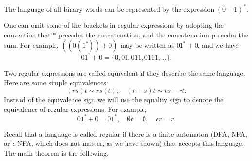 \begin{page}
\setcounter{section}{2}
\setcounter{subsection}{1}
\setcounter{dfn}{1}
\label{portion:952}

\begin{exl}
The language of all binary words can be represented by the expression $(0+1)^*$.
\end{exl}

\end{page}

\begin{page}
\setcounter{section}{2}
\setcounter{subsection}{1}
\setcounter{dfn}{1}
\label{portion:953}



One can omit some of the brackets in regular expressions by adopting the convention that $*$ precedes the concatenation, and the concatenation precedes the sum.
For example, $((0(1^*))+0)$ may be written as $01^* + 0$, and we have
\[
01^* + 0 = \{0, 01, 011, 0111, \ldots\}.
\]

Two regular expressions are called equivalent if they describe the same language.
Here are some simple equivalences:
\[
(rs)t \sim rs(t), \quad (r+s)t \sim rs + rt.
\]
Instead of the equivalence sign we will use the equality sign to denote the equivalence of regular expressions.
For example,
\[
01^* + 0 = 01^*, \quad \emptyset r = \emptyset, \quad \epsilon r = r.
\]



\end{page}

\begin{page}
\setcounter{section}{2}
\setcounter{subsection}{1}
\setcounter{dfn}{2}
\label{portion:955}


\end{page}

\begin{page}
\setcounter{section}{2}
\setcounter{subsection}{1}
\setcounter{dfn}{2}
\label{portion:956}



Recall that a language is called regular if there is a finite automaton (DFA, NFA, or $\epsilon$-NFA, which does not matter, as we have shown)
that accepts this language.
The main theorem is the following.

\end{page}


